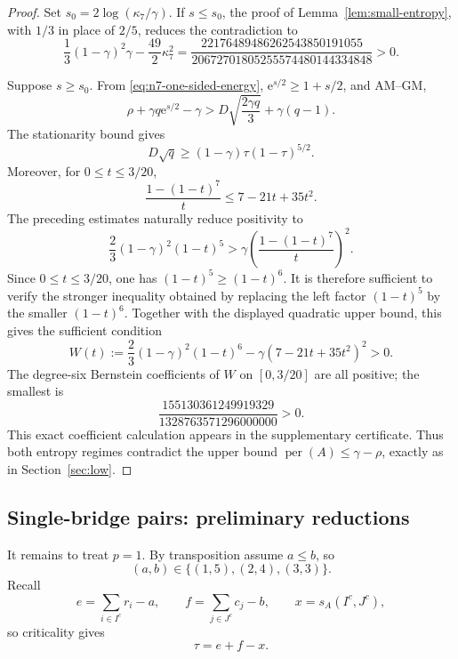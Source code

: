 \documentclass[11pt,a4paper]{article}
\numberwithin{equation}{section}
\theoremstyle{definition}
\newcommand{\per}{\operatorname{per}}
\newcommand{\1}{\mathbf{1}}
\newcommand{\e}{\mathrm{e}}
\begin{document}
\begin{proof}
Set $s_0=2\log(\kappa_7/\gamma)$.  If $s\le s_0$, the proof of
Lemma~\ref{lem:small-entropy}, with $1/3$ in place of $2/5$, reduces the
contradiction to
\begin{equation}\label{eq:n7-small-entropy-certificate}
 \frac13(1-\gamma)^2\gamma-\frac{49}{2}\kappa_7^2
 =
 \frac{22176489486262543850191055}
 {20672701805255574480144334848}>0.
\end{equation}

Suppose $s\ge s_0$.  From \eqref{eq:n7-one-sided-energy},
$\e^{s/2}\ge1+s/2$, and AM--GM,
\begin{equation}\label{eq:n7-large-start}
 \rho+\gamma q\e^{s/2}-\gamma
 >D\sqrt{\frac{2\gamma q}{3}}+\gamma(q-1).
\end{equation}
The stationarity bound gives
\[
 D\sqrt q\ge
 (1-\gamma)\tau(1-\tau)^{5/2}.
\]
Moreover, for $0\le t\le3/20$,
\[
 \frac{1-(1-t)^7}{t}
 \le7-21t+35t^2.
\]
The preceding estimates naturally reduce positivity to
\[
 \frac23(1-\gamma)^2(1-t)^5
 >\gamma\left(\frac{1-(1-t)^7}{t}\right)^2.
\]
Since $0\le t\le3/20$, one has $(1-t)^5\ge(1-t)^6$.  It is therefore
sufficient to verify the stronger inequality obtained by replacing the
left factor $(1-t)^5$ by the smaller $(1-t)^6$.  Together with the displayed
quadratic upper bound, this gives the sufficient condition
\begin{equation}\label{eq:n7-large-polynomial}
 W(t):=\frac23(1-\gamma)^2(1-t)^6
       -\gamma(7-21t+35t^2)^2>0.
\end{equation}
The degree-six Bernstein coefficients of $W$ on $[0,3/20]$ are all positive;
the smallest is
\begin{equation}\label{eq:n7-large-bernstein-min}
 \frac{155130361249919329}{1328763571296000000}>0.
\end{equation}
This exact coefficient calculation appears in the supplementary certificate.
Thus both entropy regimes contradict the upper bound
$\per(A)\le\gamma-\rho$, exactly as in Section~\ref{sec:low}.
\end{proof}

\subsection{Single-bridge pairs: preliminary reductions}

It remains to treat $p=1$.  By transposition assume $a\le b$, so
\begin{equation}\label{eq:n7-single-types}
 (a,b)\in\{(1,5),(2,4),(3,3)\}.
\end{equation}
Recall
\[
 e=\sum_{i\in I^c}r_i-a,
 \qquad
 f=\sum_{j\in J^c}c_j-b,
 \qquad
 x=s_A(I^c,J^c),
\]
so criticality gives
\begin{equation}\label{eq:n7-tau-efx}
 \tau=e+f-x.
\end{equation}
\end{document}
